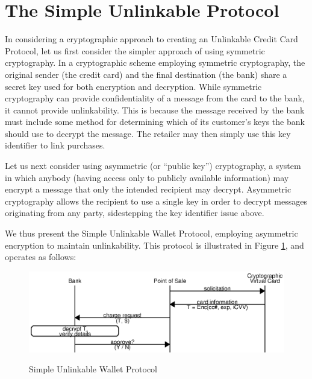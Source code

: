 \section{The Simple Unlinkable Protocol}
\label{sec:unlinkable-simple}

In considering a cryptographic approach to creating an Unlinkable Credit Card Protocol, let us first consider the simpler approach of using symmetric cryptography.
In a cryptographic scheme employing symmetric cryptography,
    the original sender (the credit card) and the final destination (the bank) share a secret key used for both encryption and decryption.
While symmetric cryptography can provide confidentiality of a message from the card to the bank, it cannot provide unlinkability.
This is because the message received by the bank must include some method for determining which of its customer's keys the bank should use to decrypt the message.
The retailer may then simply use this key identifier to link purchases.

Let us next consider using asymmetric (or ``public key'') cryptography,
  a system in which anybody (having access only to publicly available information) may encrypt a message that only the intended recipient may decrypt.
Asymmetric cryptography allows the recipient to use a single key in order to decrypt messages originating from any party, sidestepping the key identifier issue above.

We thus present the Simple Unlinkable Wallet Protocol, employing asymmetric encryption to maintain unlinkability.
This protocol is illustrated in Figure \ref{fig:simple-cpp}, and operates as follows:

\begin{figure}[h]
  \caption{Simple Unlinkable Wallet Protocol}
  \centering
    \includegraphics{img/simple-unlinkable-cpp.eps}
  \label{fig:simple-cpp}
\end{figure}

